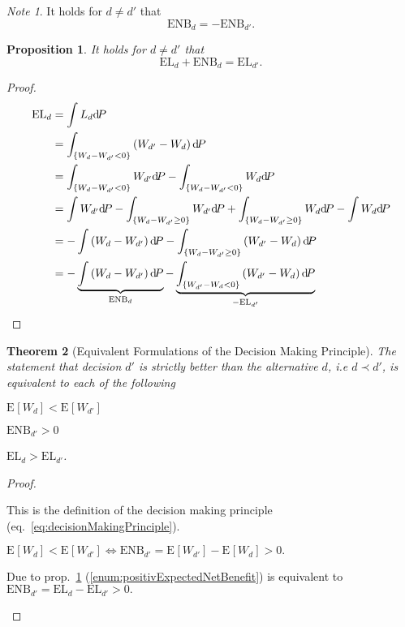 \documentclass[a4paper,10pt,twoside,pagesize,abstracton]{scrartcl}
\renewcommand{\d}{\mathrm{d}\!} %
\newcommand{\E}[2][]{\mathrm{E}_{#1}\left[#2\right]} %
\newcommand{\EL}{\mathrm{EL}} %
\newcommand{\ENB}{\mathrm{ENB}} %
\theoremstyle{plain}%
\newtheorem{thm}{Theorem}[section]
\newtheorem{prop}[thm]{Proposition}
\theoremstyle{definition}
\theoremstyle{remark}
\newtheorem*{note}{Note}
\begin{document}
\begin{note} It holds for $d\neq d'$ that
 \begin{equation}
  \ENB_d = - \ENB_{d'}.
 \end{equation}
\end{note}
\begin{prop} 
  \label{prop:ENB_EL_relation}
 It holds for $d\neq d'$ that
 \begin{equation}
  \EL_d + \ENB_d = \EL_{d'}.
 \end{equation}
\end{prop}
\begin{proof}
 \begin{align*}
  \EL_d &= \int L_d \d P\\
	&= \int_{\{W_d - W_{d'} < 0\}} \left( W_{d'} - W_d\right) \d P\\
	&= \int_{\{W_d - W_{d'} < 0\}} W_{d'} \d P - \int_{\{W_d - W_{d'} < 0\}} W_d \d P\\
	&= \int W_{d'} \d P - \int_{\{W_d - W_{d'} \geq 0\}} W_{d'} \d P + \int_{\{W_d - W_{d'} \geq 0\}} W_d \d P  - \int W_d \d P\\
	&= - \int \left( W_d - W_{d'} \right) \d P - \int_{\{W_d - W_{d'} \geq 0\}} \left( W_{d'} - W_d \right) \d P\\
	&= - \underbrace{\int \left( W_d - W_{d'} \right) \d P}_{\ENB_d}
	    - \underbrace{\int_{\{W_{d'} - W_d < 0\}} \left( W_{d'} - W_d \right) \d P}_{-\EL_{d'}}\qedhere
 \end{align*}
\end{proof}
\begin{thm}[Equivalent Formulations of the Decision Making Principle]
 The statement that decision $d'$ is strictly better than the alternative $d$, i.e $d \prec d'$, is equivalent to each of the following 
 \begin{compactenum}[(i)]
  \item $\E{W_d} < \E{W_{d'}}$
  \item \label{enum:positivExpectedNetBenefit}
    $\ENB_{d'} > 0$
  \item $\EL_d > \EL_{d'}$.
 \end{compactenum}
\end{thm}
\begin{proof}
 \begin{compactenum}[\emph{Ad}~(i):]
  \item This is the definition of the decision making principle (eq.~\ref{eq:decisionMakingPrinciple}).
  \item $\E{W_d} < \E{W_{d'}} \Longleftrightarrow \ENB_{d'} = \E{W_{d'}} - \E{W_d} > 0.$
  \item Due to prop.~\ref{prop:ENB_EL_relation} (\ref{enum:positivExpectedNetBenefit}) is equivalent to $\ENB_{d'} = \EL_d - \EL_{d'} > 0.$\qedhere
 \end{compactenum}
\end{proof}
\end{document}
